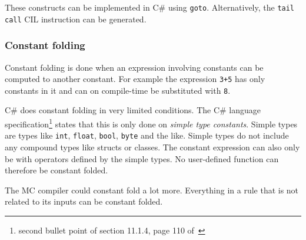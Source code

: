 These constructs can be implemented in C\# using \verb|goto|.
Alternatively, the \verb|tail call| CIL instruction can be generated.

\subsubsection{Constant folding}
Constant folding is done when an expression involving constants can be computed to another constant.
For example the expression \verb|3+5| has only constants in it and can on compile-time be substituted with \verb|8|. 

C\# does constant folding in very limited conditions.
The C\# language specification\footnote{second bullet point of section 11.1.4, page 110 of~\cite{ecma334}} states that this is only done on \textit{simple type constants}.
Simple types are types like \verb|int|, \verb|float|, \verb|bool|, \verb|byte| and the like.
Simple types do not include any compound types like structs or classes.
The constant expression can also only be with operators defined by the simple types.
No user-defined function can therefore be constant folded.

The MC compiler could constant fold a lot more.
Everything in a rule that is not related to its inputs can be constant folded.

